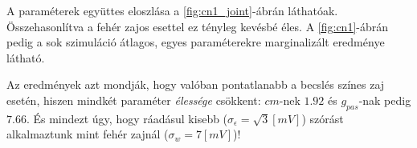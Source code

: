 A paraméterek együttes eloszlása a \ref{fig:cn1_joint}-ábrán láthatóak. Összehasonlítva a fehér zajos esettel ez tényleg kevésbé éles. A \ref{fig:cn1}-ábrán pedig a sok szimuláció átlagos, egyes paraméterekre marginalizált eredménye látható.

Az eredmények azt mondják, hogy valóban pontatlanabb a becslés színes zaj esetén, hiszen mindkét paraméter \textit{élessége} csökkent: $cm$-nek $1.92$ és $g_{pas}$-nak pedig $7.66$. És mindezt úgy, hogy ráadásul kisebb ($\sigma_\epsilon = \sqrt{3} \left[mV\right]$) szórást alkalmaztunk mint fehér zajnál ($\sigma_w = 7\left[mV\right]$)!

\begin{figure}[h!]
	\centering
	\\	

\end{figure}
